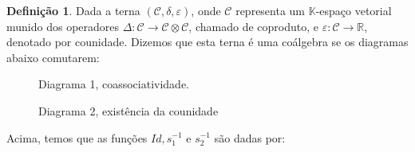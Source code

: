 \documentclass[twoside,openright,titlepage,numbers=noenddot,headinclude,  lineheaders footinclude=true,cleardoublepage=empty,
                                BCOR=5mm,paper=a4,fontsize=12pt ]{scrbook}
\theoremstyle{definition}
\newtheorem{definicao}{Definição}[chapter]
\begin{document}
\begin{definicao}

Dada a terna $(\mathcal{C}, \delta, \varepsilon)$, onde $\mathcal{C}$ representa um $\mathbb{K}$-espaço vetorial munido
dos operadores 
$\Delta: \mathcal{C} \rightarrow \mathcal{C} \otimes \mathcal{C}$, chamado de coproduto, e 
$\varepsilon: \mathcal{C} \rightarrow \mathbb{R}$,
denotado por counidade. Dizemos que esta terna é uma coálgebra se os diagramas abaixo comutarem:
\begin{figure}[h]
\centering
\begin{minipage}{.5\textwidth}
\centering
\vspace{.55cm}
\caption*{Diagrama 1, coassociatividade.}
\end{minipage}%
\begin{minipage}{.5\textwidth}
\centering
\caption*{Diagrama 2, existência da counidade}
\end{minipage}
\end{figure}

Acima, temos que as funções $Id, s^{-1}_1$ e $s^{-1}_2$ são dadas por:


\end{definicao}
\end{document}

